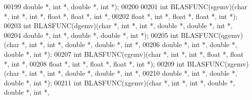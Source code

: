 \begin{DoxyCode}
00199             \textcolor{keywordtype}{double} *, \textcolor{keywordtype}{int} *, \textcolor{keywordtype}{double} *, \textcolor{keywordtype}{int} *);
00200 
00201 \textcolor{keywordtype}{int} BLASFUNC(sgemv)(\textcolor{keywordtype}{char} *, \textcolor{keywordtype}{int} *, \textcolor{keywordtype}{int} *, \textcolor{keywordtype}{float}  *, \textcolor{keywordtype}{float}  *, \textcolor{keywordtype}{int} *,
00202             \textcolor{keywordtype}{float}  *, \textcolor{keywordtype}{int} *, \textcolor{keywordtype}{float}  *, \textcolor{keywordtype}{float}  *, \textcolor{keywordtype}{int} *);
00203 \textcolor{keywordtype}{int} BLASFUNC(dgemv)(\textcolor{keywordtype}{char} *, \textcolor{keywordtype}{int} *, \textcolor{keywordtype}{int} *, \textcolor{keywordtype}{double} *, \textcolor{keywordtype}{double} *, \textcolor{keywordtype}{int} *,
00204             \textcolor{keywordtype}{double} *, \textcolor{keywordtype}{int} *, \textcolor{keywordtype}{double} *, \textcolor{keywordtype}{double} *, \textcolor{keywordtype}{int} *);
00205 \textcolor{keywordtype}{int} BLASFUNC(qgemv)(\textcolor{keywordtype}{char} *, \textcolor{keywordtype}{int} *, \textcolor{keywordtype}{int} *, \textcolor{keywordtype}{double} *, \textcolor{keywordtype}{double} *, \textcolor{keywordtype}{int} *,
00206             \textcolor{keywordtype}{double} *, \textcolor{keywordtype}{int} *, \textcolor{keywordtype}{double} *, \textcolor{keywordtype}{double} *, \textcolor{keywordtype}{int} *);
00207 \textcolor{keywordtype}{int} BLASFUNC(cgemv)(\textcolor{keywordtype}{char} *, \textcolor{keywordtype}{int} *, \textcolor{keywordtype}{int} *, \textcolor{keywordtype}{float}  *, \textcolor{keywordtype}{float}  *, \textcolor{keywordtype}{int} *,
00208             \textcolor{keywordtype}{float}  *, \textcolor{keywordtype}{int} *, \textcolor{keywordtype}{float}  *, \textcolor{keywordtype}{float}  *, \textcolor{keywordtype}{int} *);
00209 \textcolor{keywordtype}{int} BLASFUNC(zgemv)(\textcolor{keywordtype}{char} *, \textcolor{keywordtype}{int} *, \textcolor{keywordtype}{int} *, \textcolor{keywordtype}{double} *, \textcolor{keywordtype}{double} *, \textcolor{keywordtype}{int} *,
00210             \textcolor{keywordtype}{double} *, \textcolor{keywordtype}{int} *, \textcolor{keywordtype}{double} *, \textcolor{keywordtype}{double} *, \textcolor{keywordtype}{int} *);
00211 \textcolor{keywordtype}{int} BLASFUNC(xgemv)(\textcolor{keywordtype}{char} *, \textcolor{keywordtype}{int} *, \textcolor{keywordtype}{int} *, \textcolor{keywordtype}{double} *, \textcolor{keywordtype}{double} *, \textcolor{keywordtype}{int} *,

\end{DoxyCode}
